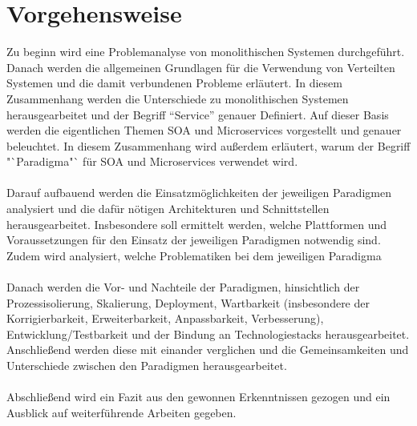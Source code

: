 \section{Vorgehensweise}
\label{sec:Vorgehensweise}
Zu beginn wird eine Problemanalyse von monolithischen Systemen durchgeführt. Danach werden die allgemeinen Grundlagen für die Verwendung von Verteilten Systemen und die damit verbundenen Probleme erläutert. In diesem Zusammenhang werden die Unterschiede zu monolithischen Systemen herausgearbeitet und der Begriff "`Service"' genauer Definiert. Auf dieser Basis werden die eigentlichen Themen SOA und Microservices vorgestellt und genauer beleuchtet. In diesem Zusammenhang wird außerdem erläutert, warum der Begriff "`Paradigma"` für SOA und Microservices verwendet wird.
\\\\
Darauf aufbauend werden die Einsatzmöglichkeiten der jeweiligen Paradigmen analysiert und die dafür nötigen Architekturen und Schnittstellen herausgearbeitet. Insbesondere soll ermittelt werden, welche Plattformen und Voraussetzungen für den Einsatz der jeweiligen Paradigmen notwendig sind. Zudem wird analysiert, welche Problematiken bei dem jeweiligen Paradigma
\\\\
Danach werden die Vor- und Nachteile der Paradigmen, hinsichtlich der Prozessisolierung, Skalierung, Deployment, Wartbarkeit (insbesondere der Korrigierbarkeit, Erweiterbarkeit, Anpassbarkeit, Verbesserung), Entwicklung/Testbarkeit und der Bindung an Technologiestacks herausgearbeitet. Anschließend werden diese mit einander verglichen und die Gemeinsamkeiten und Unterschiede zwischen den Paradigmen herausgearbeitet.
\\\\
Abschließend wird ein Fazit aus den gewonnen Erkenntnissen gezogen und ein Ausblick auf weiterführende Arbeiten gegeben.